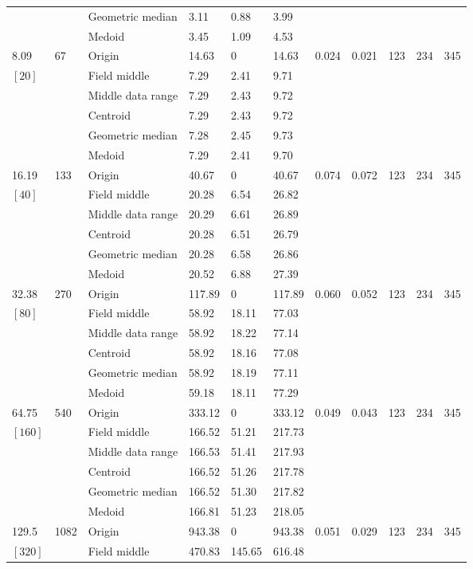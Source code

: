 \documentclass[phd,showgrids]{ndsu-thesis-2022}
\begin{document}
\begin{landscape}
{{\begin{ThreePartTable}
\begin{longtable}{lll lll ll rrr}
 &  & Geometric median & 3.11 & 0.88 & 3.99 \\
 &  & Medoid  & 3.45 & 1.09 & 4.53 \\
\midrule
8.09 & 67 & Origin  & 14.63 & 0 & 14.63 & 0.024 & 0.021 & 123 & 234 & 345 \\
$[20]$ &  & Field middle  & 7.29 & 2.41 & 9.71 \\
 &  & Middle data range  & 7.29 & 2.43 & 9.72 \\
 &  & Centroid & 7.29 & 2.43 & 9.72 \\
 &  & Geometric median & 7.28 & 2.45 & 9.73 \\
 &  & Medoid  & 7.29 & 2.41 & 9.70 \\ 
\midrule
16.19 & 133 & Origin  & 40.67 & 0 & 40.67 & 0.074 & 0.072 & 123 & 234 & 345 \\
$[40]$ &  & Field middle  & 20.28 & 6.54 & 26.82 \\
 &  & Middle data range  & 20.29 & 6.61 & 26.89 \\
 &  & Centroid & 20.28 & 6.51 & 26.79 \\
 &  & Geometric median & 20.28 & 6.58 & 26.86 \\
 &  & Medoid  & 20.52 & 6.88 & 27.39 \\
\midrule
32.38 & 270 & Origin  & 117.89 & 0 & 117.89 & 0.060 & 0.052 & 123 & 234 & 345 \\
$[80]$ &  & Field middle  & 58.92 & 18.11 & 77.03 \\
 &  & Middle data range  & 58.92 & 18.22 & 77.14 \\
 &  & Centroid & 58.92 & 18.16 & 77.08 \\
 &  & Geometric median & 58.92 & 18.19 & 77.11 \\
 &  & Medoid  & 59.18 & 18.11 & 77.29 \\
\midrule
64.75 & 540 & Origin  & 333.12 & 0 & 333.12 & 0.049 & 0.043 & 123 & 234 & 345 \\
$[160]$ &  & Field middle  & 166.52 & 51.21 & 217.73 \\
 &  & Middle data range  & 166.53 & 51.41 & 217.93 \\
 &  & Centroid & 166.52 & 51.26 & 217.78 \\
 &  & Geometric median & 166.52 & 51.30 & 217.82 \\
 &  & Medoid  & 166.81 & 51.23 & 218.05 \\
\midrule
129.5 & 1082 & Origin  & 943.38 & 0 & 943.38 & 0.051 & 0.029 & 123 & 234 & 345 \\
$[320]$ &  & Field middle  & 470.83 & 145.65 & 616.48 \\

\end{longtable}
\end{ThreePartTable}}}
\end{landscape}
\end{document}
